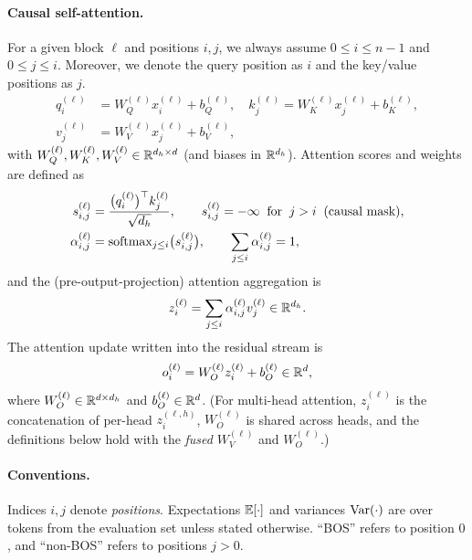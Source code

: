 \documentclass{article}
\theoremstyle{plain}
\theoremstyle{definition}
\theoremstyle{remark}
\begin{document}
\paragraph{Causal self-attention.}
For a given block $\ell$ and positions $i, j$, we always assume $0\le i \le n-1$ and $0\le j \le i$.
Moreover, we denote the query position as $i$ and the key/value positions as $j$.
\begin{align}
q_i^{(\ell)} &= W_Q^{(\ell)} x_i^{(\ell)} + b_Q^{(\ell)},\quad
k_j^{(\ell)} = W_K^{(\ell)} x_j^{(\ell)} + b_K^{(\ell)}, \\
v_j^{(\ell)} &= W_V^{(\ell)} x_j^{(\ell)} + b_V^{(\ell)},
\end{align}
with $W_Q^{(\ell)},W_K^{(\ell)},W_V^{(\ell)}\in\mathbb{R}^{d_h\times d}$ (and biases in $\mathbb{R}^{d_h}$).
Attention scores and weights are defined as
\begin{align}
s_{i,j}^{(\ell)} &= \frac{\big(q_i^{(\ell)}\big)^\top k_j^{(\ell)}}{\sqrt{d_h}},
\qquad
s_{i,j}^{(\ell)}=-\infty \;\;\text{for}\;\; j>i \;\;(\text{causal mask}), \\
\alpha_{i,j}^{(\ell)} &= \operatorname{softmax}_{j\le i}\!\big(s_{i,j}^{(\ell)}\big),
\qquad
\sum_{j\le i}\alpha_{i,j}^{(\ell)}=1,
\end{align}
and the (pre-output-projection) attention aggregation is
\begin{equation}
z_i^{(\ell)} = \sum_{j\le i}\alpha_{i,j}^{(\ell)} v_j^{(\ell)} \in \mathbb{R}^{d_h}.
\end{equation}
The attention update written into the residual stream is
\begin{equation}
o_i^{(\ell)} = W_O^{(\ell)} z_i^{(\ell)} + b_O^{(\ell)} \in \mathbb{R}^d,
\end{equation}
where $W_O^{(\ell)}\in\mathbb{R}^{d\times d_h}$ and $b_O^{(\ell)}\in\mathbb{R}^d$.
(For multi-head attention, $z_i^{(\ell)}$ is the concatenation of per-head $z_i^{(\ell,h)}$, $W_O^{(\ell)}$ is shared across heads,
and the definitions below hold with the \emph{fused} $W_V^{(\ell)}$ and $W_O^{(\ell)}$.)

\paragraph{Conventions.}
Indices $i,j$ denote \emph{positions}. Expectations $\mathbb{E}[\cdot]$ and variances $\mathrm{Var}(\cdot)$ are over tokens
from the evaluation set unless stated otherwise.
``BOS'' refers to position $0$, and ``non-BOS'' refers to positions $j>0$.
\end{document}
